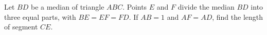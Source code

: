 Let $BD$ be a median of triangle $ABC$. Points $E$ and $F$ divide the median $BD$ into three equal parts, with $BE=EF=FD$. If $AB=1$ and $AF=AD$, find the length of segment $CE$.
